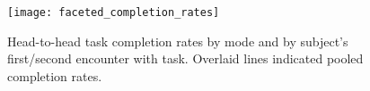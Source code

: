 \begin{figure}
\texttt{[image: faceted\_completion\_rates]}
\caption{Head-to-head task completion rates by mode and by subject's first/second encounter with task.
Overlaid lines indicated pooled completion rates.}
\label{fig:faceted_completion_rates}
\end{figure}
